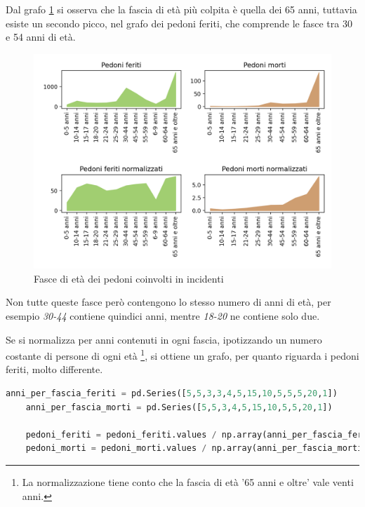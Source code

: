 \documentclass[a4paper]{report}
\begin{document}

Dal grafo \ref{fig:eta-pedoni} si osserva che la fascia di età più colpita 
è quella dei 65 anni, tuttavia esiste un secondo picco, nel grafo dei pedoni feriti, 
che  comprende le fasce tra 30 e 54 anni di età.

\begin{figure}
    \includegraphics[width=\linewidth]{../src/incidenti/incidenti_senza_coords/pedoni/eta_pedoni.png}
    \caption{Fasce di età dei pedoni coinvolti in incidenti}
    \label{fig:eta-pedoni}
\end{figure}

Non tutte queste fasce però contengono lo stesso numero di anni di età, per esempio 
\textit{30-44} contiene quindici anni, mentre \textit{18-20} ne contiene solo due.

Se si normalizza per anni contenuti in ogni fascia, ipotizzando un numero
costante di persone di ogni età
\footnote{La normalizzazione tiene conto che la fascia di età '65 anni e oltre' vale venti anni.}, 
si ottiene un grafo, per quanto riguarda i pedoni feriti, molto differente.

\begin{lstlisting}[language=Python]
    anni_per_fascia_feriti = pd.Series([5,5,3,3,4,5,15,10,5,5,5,20,1])
    anni_per_fascia_morti = pd.Series([5,5,3,4,5,15,10,5,5,20,1])
    
    pedoni_feriti = pedoni_feriti.values / np.array(anni_per_fascia_feriti)
    pedoni_morti = pedoni_morti.values / np.array(anni_per_fascia_morti)
\end{lstlisting}
\end{document}
